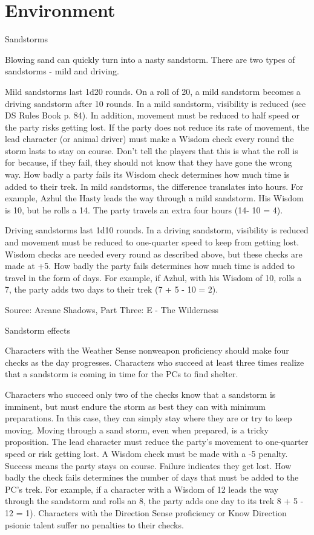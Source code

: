 \chapter{Environment}\label{chap:environment}
Sandstorms

Blowing sand can quickly turn into a nasty sandstorm. There are two types of sandstorms - mild and driving.

Mild sandstorms last 1d20 rounds. On a roll of 20, a mild sandstorm becomes a driving sandstorm after 10 rounds. In a mild sandstorm, visibility is reduced (see DS Rules Book p. 84). In addition, movement must be reduced to half speed or the party risks getting lost. If the party does not reduce its rate of movement, the lead character (or animal driver) must make a Wisdom check every round the storm lasts to stay on course. Don't tell the players that this is what the roll is for because, if they fail, they should not know that they have gone the wrong way. How badly a party fails its Wisdom check determines how much time is added to their trek. In mild sandstorms, the difference translates into hours. For example, Azhul the Hasty leads the way through a mild sandstorm. His Wisdom is 10, but he rolls a 14. The party travels an extra four hours (14- 10 = 4).

Driving sandstorms last 1d10 rounds. In a driving sandstorm, visibility is reduced and movement must be reduced to one-quarter speed to keep from getting lost. Wisdom checks are needed every round as described above, but these checks are made at +5. How badly the party fails determines how much time is added to travel in the form of days. For example, if Azhul, with his Wisdom of 10, rolls a 7, the party adds two days to their trek (7 + 5 - 10 = 2).

Source: Arcane Shadows, Part Three: E - The Wilderness

Sandstorm effects

Characters with the Weather Sense nonweapon proficiency should make four checks as the day progresses. Characters who succeed at least three times realize that a sandstorm is coming in time for the PCs to find shelter.

Characters who succeed only two of the checks know that a sandstorm is imminent, but must endure the storm as best they can with minimum preparations. In this case, they can simply stay where they are or try to keep moving. Moving through a sand storm, even when prepared, is a tricky proposition. The lead character must reduce the party's movement to one-quarter speed or risk getting lost. A Wisdom check must be made with a -5 penalty. Success means the party stays on course. Failure indicates they get lost. How badly the check fails determines the number of days that must be added to the PC's trek. For example, if a character with a Wisdom of 12 leads the way through the sandstorm and rolls an 8, the party adds one day to its trek 8 + 5 - 12 = 1). Characters with the Direction Sense proficiency or Know Direction psionic talent suffer no penalties to their checks.

